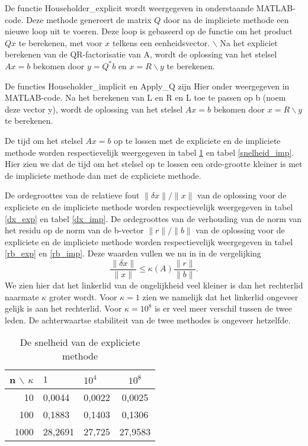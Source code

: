 De functie Householder\_explicit wordt weergegeven in onderstaande MATLAB-code. Deze methode genereert de matrix $Q$ door na de impliciete methode een nieuwe loop uit te voeren. Deze loop is gebaseerd op de functie om het product $Qx$ te berekenen, met voor $x$ telkens een eenheidsvector.
$\backslash$
Na het expliciet berekenen van de QR-factorisatie van A, wordt de oplossing van het stelsel $Ax=b$ bekomen door $y = Q^*b$ en $x= R\backslash y$ te berekenen.



De functies Householder\_implicit en Apply\_Q zijn Hier onder weergegeven in MATLAB-code.
Na het berekenen van L en R en L toe te passen op b (noem deze vector y), wordt de oplossing van het stelsel $Ax=b$ bekomen door $x= R\backslash y$ te berekenen. 





De tijd om het stelsel $Ax=b$ op te lossen met de expliciete en de impliciete methode worden respectievelijk weergegeven in tabel \ref{snelheid_exp} en tabel \ref{snelheid_imp}. Hier zien we dat de tijd om het stelsel op te lossen een orde-grootte kleiner is met de impliciete methode dan met de expliciete methode.

De ordegroottes van de relatieve fout $\lVert \delta x \rVert/\lVert x \rVert$ van de oplossing voor de expliciete en de impliciete methode worden respectievelijk weergegeven in tabel \ref{dx_exp} en tabel \ref{dx_imp}.
De ordegroottes van de verhouding van de norm van het residu op de norm van de b-vector $\lVert r \rVert/\lVert b \rVert$ van de oplossing voor de expliciete en de impliciete methode worden respectievelijk weergegeven in tabel \ref{rb_exp} en \ref{rb_imp}. Deze waarden vullen we nu in in de vergelijking
$$ \frac{\lVert \delta x \rVert}{\lVert x \rVert} \leq \kappa(A) \frac{\lVert r \rVert}{\lVert b \rVert}.$$
We zien hier dat het linkerlid van de ongelijkheid veel kleiner is dan het rechterlid naarmate $\kappa$ groter wordt. Voor $\kappa = 1$ zien we namelijk dat het linkerlid ongeveer gelijk is aan het rechterlid. Voor $\kappa = 10^8$ is er veel meer verschil tussen de twee leden. De achterwaartse stabiliteit van de twee methodes is ongeveer hetzelfde. 

\begin{table}[H]
\begin{center}
\begin{tabular}{r|llc}
n $\backslash$ $\kappa$ & $1$ & $10^4$ & $10^8$ \\\hline
10 & 0,0044 & 0,0022 & 0,0025 \\
100 & 0,1883 & 0,1403 & 0,1306 \\
1000 & 28,2691 & 27,725 & 27,9583
\end{tabular}
\end{center}
\caption{De snelheid van de expliciete methode}
\label{snelheid_exp}
\end{table}

